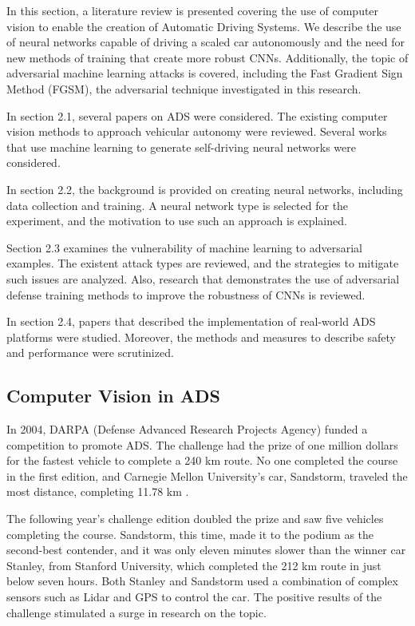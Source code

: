 \documentclass[12pt]{article}
\begin{document}
In this section, a literature review is presented covering the use of computer vision to enable the creation of Automatic Driving Systems. We describe the use of neural networks capable of driving a scaled car autonomously and the need for new methods of training that create more robust CNNs. Additionally, the topic of adversarial machine learning attacks is covered, including the Fast Gradient Sign Method (FGSM), the adversarial technique investigated in this research. 

In section 2.1, several papers on ADS were considered. The existing computer vision methods to approach vehicular autonomy were reviewed. Several works that use machine learning to generate self-driving neural networks were considered.

In section 2.2, the background is provided on creating neural networks, including data collection and training. A neural network type is selected for the experiment, and the motivation to use such an approach is explained. 

Section 2.3 examines the vulnerability of machine learning to adversarial examples. The existent attack types are reviewed, and the strategies to mitigate such issues are analyzed. Also, research that demonstrates the use of adversarial defense training methods to improve the robustness of CNNs is reviewed. 

In section 2.4, papers that described the implementation of real-world ADS platforms were studied. Moreover, the methods and measures to describe safety and performance were scrutinized. 

\subsection{Computer Vision in ADS}

In 2004, DARPA (Defense Advanced Research Projects Agency) funded a competition to promote ADS. The challenge had the prize of one million dollars for the fastest vehicle to complete a 240 km route. No one completed the course in the first edition, and Carnegie Mellon University's car, Sandstorm, traveled the most distance, completing 11.78 km \parencite{darpa}. 

The following year's challenge edition doubled the prize and saw five vehicles completing the course. Sandstorm, this time, made it to the podium as the second-best contender, and it was only eleven minutes slower than the winner car Stanley, from Stanford University, which completed the 212 km route in just below seven hours. Both Stanley and Sandstorm used a combination of complex sensors such as Lidar and GPS to control the car. The positive results of the challenge stimulated a surge in research on the topic.
\end{document}
